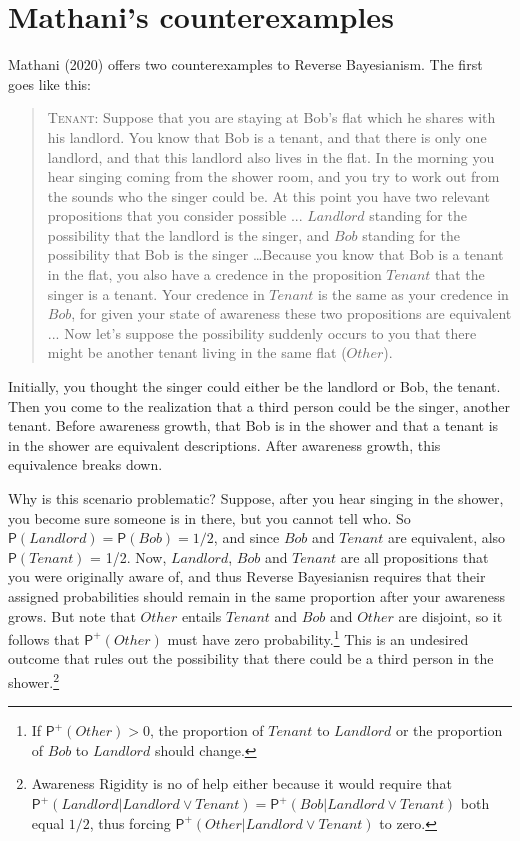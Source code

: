 \documentclass[
  11pt,
  dvipsnames,enabledeprecatedfontcommands]{scrartcl}
\newcommand{\pr}[1]{\ensuremath{\mathsf{P}(#1)}}
\newcommand{\ppr}[2]{\ensuremath{\mathsf{P}^{#1}(#2)}}
\begin{document}
\hypertarget{mathanis-counterexamples}{%
\section{Mathani's counterexamples}\label{mathanis-counterexamples}}

\label{sec:mathani}

Mathani (2020) offers two counterexamples to Reverse Bayesianism. The
first goes like this:

\begin{quote}
\textsc{Tenant}: Suppose that you are staying at Bob's flat which he shares with his landlord. You know
that Bob is a tenant, and that there is only one landlord, and that this landlord also
lives in the flat. In the morning you hear singing coming from the shower room, and
you try to work out from the sounds who the singer could be. At this point you have
two relevant propositions that you consider possible ... $Landlord$ standing for the possibility that the landlord is the singer, and $Bob$ standing for the possibility that Bob is the singer  \dots  Because you know that Bob is a tenant in the flat, you also have a credence in the proposition $Tenant$ that the singer is a tenant. Your credence in $Tenant$ is the same as your credence in $Bob$, for given your state of awareness these two propositions are equivalent ... Now let's suppose the possibility suddenly occurs to you that there might be another tenant living in the same flat  ($Other$).
\end{quote}

\doublespace

\noindent Initially, you thought the singer could either be the landlord
or Bob, the tenant. Then you come to the realization that a third person
could be the singer, another tenant. Before awareness growth, that Bob
is in the shower and that a tenant is in the shower are equivalent
descriptions. After awareness growth, this equivalence breaks down.

Why is this scenario problematic? Suppose, after you hear singing in the
shower, you become sure someone is in there, but you cannot tell who. So
\(\pr{Landlord} = \pr{Bob} = 1/2\), and since \(Bob\) and \(Tenant\) are
equivalent, also \(\pr{Tenant}\) = 1/2. Now, \(Landlord\), \(Bob\) and
\(Tenant\) are all propositions that you were originally aware of, and
thus Reverse Bayesianisn requires that their assigned probabilities
should remain in the same proportion after your awareness grows. But
note that \(Other\) entails \(Tenant\) and \(Bob\) and \(Other\) are
disjoint, so it follows that \(\ppr{+}{Other}\) must have zero
probability.\footnote{If \(\ppr{+}{Other}>0\), the proportion of
  \(Tenant\) to \(Landlord\) or the proportion of \(Bob\) to
  \(Landlord\) should change.} This is an undesired outcome that rules
out the possibility that there could be a third person in the
shower.\footnote{Awareness Rigidity is no of help either because it
  would require that
  \(\ppr{+}{Landlord \vert Landlord \vee Tenant}=\ppr{+}{Bob \vert Landlord \vee Tenant}\)
  both equal \(1/2\), thus forcing
  \(\ppr{+}{Other \vert Landlord \vee Tenant}\) to zero.}
\end{document}
